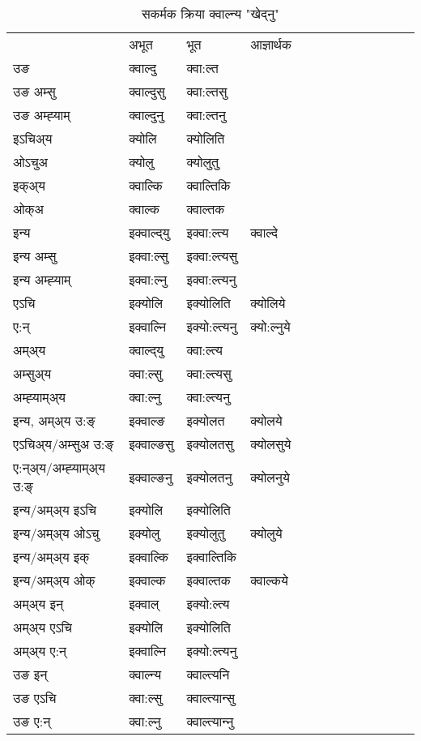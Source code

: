 \begin{table}[H]
\label{olt.vt} \centering
\caption{सकर्मक क्रिया  क्‍वाल्न्य  "खेद्‍नु"  }
\begin{tabular}{l|l|l|l|l|l|l|l|l|l|l|l|l}  \toprule
&अभूत & भूत & आज्ञार्थक \\ 
उङ &क्‍वाल्दु &क्‍वा:ल्त \\ 
उङ अम्सु&क्‍वाल्दुसु &क्‍वा:ल्तसु \\ 
उङ अम्ह्‍याम्&क्‍वाल्दुनु &क्‍वा:ल्तनु \\ 
इऽचिअ्य &क्योलि &क्योलिति   \\ 
ओऽचुअ        &क्योलु &क्योलुतु   \\ 
इक्अ्य&क्‍वाल्कि &क्‍वाल्तिकि   \\ 
ओक्अ &क्‍वाल्क &क्‍वाल्तक   \\ 
इन्य & इक्‍वाल्द्‌यु  & इक्‍वा:ल्त्य &क्‍वाल्दे  \\ 
इन्य अम्सु& इक्‍वा:ल्सु  & इक्‍वा:ल्त्यसु   \\ 
इन्य अम्ह्‍याम्& इक्‍वा:ल्नु  & इक्‍वा:ल्त्यनु   \\ 
एऽचि & इक्योलि & इक्योलिति &क्योलिये    \\ 
ए:न् & इक्‍वाल्नि  & इक्यो:ल्त्यनु &क्यो:ल्नुये  \\ 
अम्अ्य & क्‍वाल्द्‌यु  & क्‍वा:ल्त्य  \\ 
अम्सुअ्य & क्‍वा:ल्सु & क्‍वा:ल्त्यसु  \\ 
अम्ह्‍याम्अ्य & क्‍वा:ल्नु  & क्‍वा:ल्त्यनु \\ 
\midrule
इन्य, अम्अ्य उ:ङ्‌ &इक्‍वाल्ङ &इक्योलत &क्योलये \\ 
एऽचिअ्य/अम्सुअ उ:ङ्‌ &इक्‍वाल्ङसु &इक्योलतसु &क्योलसुये \\ 
ए:न्अ्य/अम्ह्‍याम्अ्य उ:ङ्‌ &इक्‍वाल्ङनु &इक्योलतनु &क्योलनुये \\ 
इन्य/अम्अ्य इऽचि &इक्योलि &इक्योलिति    \\ 
इन्य/अम्अ्य ओऽचु &इक्योलु &इक्योलुतु  &क्योलुये  \\ 
इन्य/अम्अ्य इक् &इक्‍वाल्कि &इक्‍वाल्तिकि   \\ 
इन्य/अम्अ्य ओक् &इक्‍वाल्क &इक्‍वाल्तक  &क्‍वाल्कये  \\ 
अम्अ्य इन् & इक्‍वाल् & इक्यो:ल्त्य   \\ 
अम्अ्य एऽचि & इक्योलि & इक्योलिति    \\ 
अम्अ्य ए:न् & इक्‍वाल्नि  & इक्यो:ल्त्यनु  \\ 
\midrule
उङ इन् & क्‍वाल्न्य  & क्‍वाल्त्यनि  \\ 
उङ एऽचि & क्‍वा:ल्सु  & क्‍वाल्त्यान्सु   \\ 
उङ ए:न्& क्‍वा:ल्नु  & क्‍वाल्त्यान्‍नु   \\ 
\bottomrule
\end{tabular}
\end{table}


